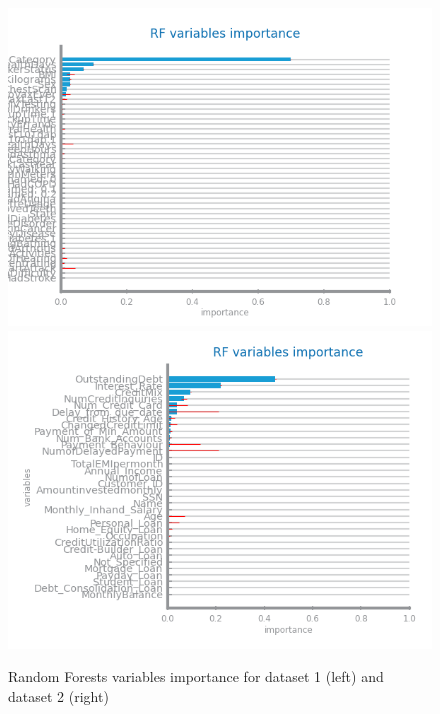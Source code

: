 \documentclass[10pt]{extarticle}
\begin{document}
\begin{figure}[H]
\centering\includegraphics[scale=0.7]{images/dataset1/models_evaluation/CovidPos_rf_recall_vars_ranking.png}
\includegraphics[scale=0.7]{images/dataset2/models_evaluation/Credit_Score_rf_accuracy_vars_ranking.png}
\caption{Random Forests variables importance for dataset 1 (left) and dataset 2 (right)}
\end{figure}
\end{document}
